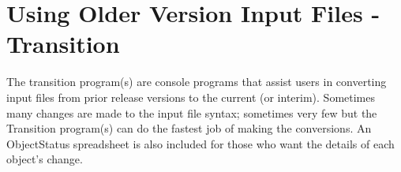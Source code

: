 \chapter{Using Older Version Input Files - Transition}\label{using-older-version-input-files---transition}

The transition program(s) are console programs that assist users in converting input files from prior release versions to the current (or interim). Sometimes many changes are made to the input file syntax; sometimes very few but the Transition program(s) can do the fastest job of making the conversions. An ObjectStatus spreadsheet is also included for those who want the details of each object's change.
